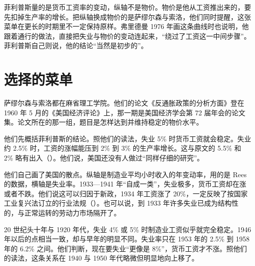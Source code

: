 \begin{pitfall}[菲利普斯发现了通胀与失业的交替关系]
菲利普斯量的是货币工资率的变动，纵轴不是物价\cite{phillips1958}。物价是他从工资推出来的，要先扣掉生产率的增长。把纵轴换成物价的是萨缪尔森与索洛，他们同时提醒，这张菜单在更长的时期里不一定保持原样\cite{samuelson1960}。弗里德曼 1976 年画这条曲线时也说明，他跟着通行的做法，直接把失业与物价的变动连起来，“绕过了工资这一中间步骤”\cite{friedman1976}。菲利普斯自己则说，他的结论“当然是初步的”\cite{phillips1958}。
\end{pitfall}

\section{选择的菜单}\label{sec:phillips-menu}

萨缪尔森与索洛都在麻省理工学院\cite{samuelson1960}。他们的论文《反通胀政策的分析方面》登在 1960 年 5 月的《美国经济评论》上，那一期是美国经济学会第 72 届年会的论文集\cite{samuelson1960}。论文所在的那一组，题目是怎样达到并维持稳定的物价水平\cite{samuelson1960}。

他们先概括菲利普斯的结论\cite{samuelson1960}。照他们的读法，失业 5\% 时货币工资就会稳定\cite{samuelson1960}。失业约 2.5\% 时，工资的涨幅能压到 2\% 到 3\% 的生产率增长\cite{samuelson1960}。这与原文的 5.5\% 和 2\% 略有出入（）。他们说，美国还没有人做过“同样仔细的研究”\cite{samuelson1960}。

他们自己画了美国的散点\cite{samuelson1960}。纵轴是制造业平均小时收入的年变动率，用的是 Rees 的数据，横轴是失业率\cite{samuelson1960}。1933—1941 年“自成一类”，失业极多，货币工资却在涨或者不跌\cite{samuelson1960}。他们说这可以归因于新政，1934 年工资涨了 20\%，一定反映了按国家工业复兴法订立的行业法规（）\cite{samuelson1960}。也可以说，到 1933 年许多失业已成为结构性的，与正常运转的劳动力市场隔开了\cite{samuelson1960}。

20 世纪头十年与 1920 年代，失业 4\% 或 5\% 时制造业工资似乎就完全稳定\cite{samuelson1960}。1946 年以后的点相当一致，却与早年的明显不同\cite{samuelson1960}。失业率只在 1953 年的 2.5\% 到 1958 年的 6.2\% 之间\cite{samuelson1960}。他们判断，现在要失业“更像是 8\%”，货币工资才不涨。照他们的读法，这条关系在 1940 与 1950 年代略微但明显地向上移了\cite{samuelson1960}。


